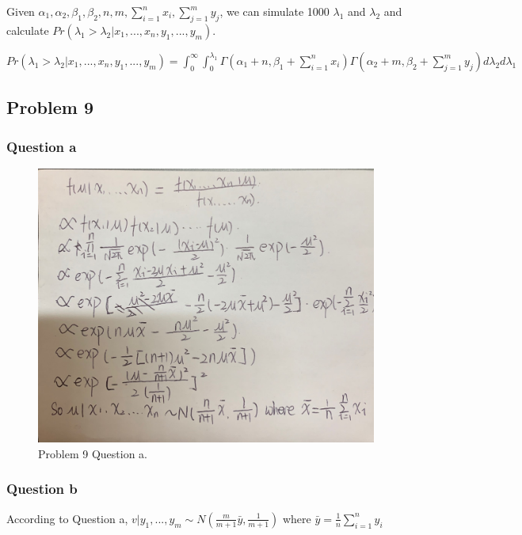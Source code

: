 \documentclass[]{article}
\begin{document}
Given
\(\alpha_1, \alpha_2, \beta_1, \beta_2, n, m, \sum_{i=1}^nx_i, \sum_{j=1}^my_j\),
we can simulate 1000 \(\lambda_1\) and \(\lambda_2\) and calculate
\(Pr(\lambda_1>\lambda_2|x_1,...,x_n,y_1,...,y_m)\).

\(Pr(\lambda_1>\lambda_2|x_1,...,x_n,y_1,...,y_m)=\int_0^\infty\int_0^{\lambda_1}\Gamma(\alpha_1+n, \beta_1+\sum_{i=1}^nx_i)\Gamma(\alpha_2+m,\beta_2+\sum_{j=1}^my_j)d\lambda_2d\lambda_1\)

\hypertarget{problem-9}{%
\subsection{Problem 9}\label{problem-9}}

\hypertarget{question-a-4}{%
\subsubsection{Question a}\label{question-a-4}}

\begin{figure}
\centering
\includegraphics{./Problem9.jpg}
\caption{Problem 9 Question a.}
\end{figure}

\hypertarget{question-b-4}{%
\subsubsection{Question b}\label{question-b-4}}

According to Question a,
\(v|y_1,...,y_m \sim N(\frac{m}{m+1}\bar y,\frac{1}{m+1})\) where
\(\bar y = \frac{1}{n}\sum_{i=1}^ny_i\)
\end{document}
